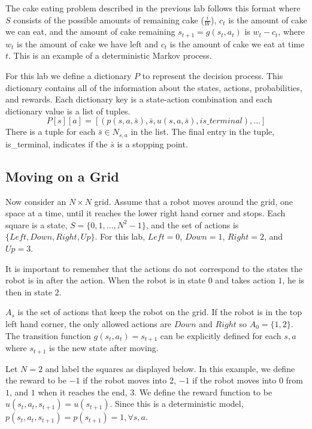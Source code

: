 The cake eating problem described in the previous lab follows this format where $S$ consists of the possible amounts of remaining cake ($\frac{i}{W}$), $c_t$ is the amount of cake we can eat, and the amount of cake remaining $s_{t+1}=g(s_t,a_t)$ is $w_t-c_t$, where $w_t$ is the amount of cake we have left and $c_t$ is the amount of cake we eat at time $t$. 
This is an example of a deterministic Markov process.

For this lab we define a dictionary $P$ to represent the decision process.
This dictionary contains all of the information about the states, actions, probabilities, and rewards.
Each dictionary key is a state-action combination and each dictionary value is a list of tuples.
\[P[s][a]=[(p(s,a,\bar{s}), \bar{s}, u(s,a,\bar{s}), is\_terminal),...]\]
There is a tuple for each $\bar{s}\in N_{s,a}$ in the list.
The final entry in the tuple, is\_terminal, indicates if the $\bar{s}$ is a stopping point.


\subsection*{Moving on a Grid}

Now consider an $N \times N$ grid.
Assume that a robot moves around the grid, one space at a time, until it reaches the lower right hand corner and stops.
Each square is a state, $S = \{0, 1, \ldots, N^2-1\}$, and the set of actions is $\{Left, Down, Right, Up\}$.
For this lab, $Left = 0$, $Down = 1$, $Right = 2$, and $Up = 3$.

\begin{warn}
It is important to remember that the actions do not correspond to the states the robot is in after the action.
When the robot is in state $0$ and takes action $1$, he is then in state $2$.
\end{warn}

$A_s$ is the set of actions that keep the robot on the grid.
If the robot is in the top left hand corner, the only allowed actions are $Down$ and $Right$ so $A_0 = \{1,2\}$.
The transition function $g(s_t,a_t) = s_{t+1}$ can be explicitly defined for each $s, a$ where $s_{t+1}$ is the new state after moving.

Let $N=2$ and label the squares as displayed below.
In this example, we define the reward to be $-1$ if the robot moves into 2, $-1$ if the robot moves into $0$ from $1$, and $1$ when it reaches the end, $3$.
We define the reward function to be $u(s_t,a_t,s_{t+1})=u(s_{t+1})$.
Since this is a deterministic model, $p(s_t,a_t,s_{t+1}) = p(s_{t+1}) = 1,\forall s,a$.

